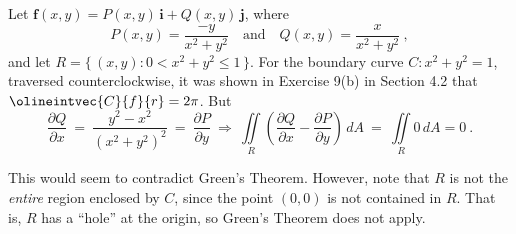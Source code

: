 \begin{exa}\label{exa:greenhole}
 Let $\textbf{f}(x,y) = P(x,y)\,\textbf{i} + Q(x,y)\,\textbf{j}$, where
 \begin{displaymath}
  P(x,y) = \frac{-y}{x^2 + y^2} \quad\text{and}\quad Q(x,y) = \frac{x}{x^2 + y^2} ~,
 \end{displaymath}
 and let $R =\lbrace\,(x,y): 0 < x^2 + y^2 \le 1\,\rbrace$. For the boundary curve $C:x^2 + y^2 = 1$, traversed
 counterclockwise, it was shown in Exercise 9(b) in Section 4.2 that $\olineintvec{C}{f}{r} = 2\pi$. But
 \begin{displaymath}
  \frac{\partial Q}{\partial x} ~=~ \frac{y^2 - x^2}{(x^2 + y^2 )^2} ~=~ \frac{\partial P}{\partial y} ~
  \Rightarrow ~
  \iint\limits_{R} \left( \frac{\partial Q}{\partial x} - \frac{\partial P}{\partial y} \right)\,dA ~=~
  \iint\limits_{R} 0 \,dA = 0~.
 \end{displaymath}
\end{exa}
This would seem to contradict Green's Theorem. However, note that $R$ is not the \emph{entire} region enclosed by $C$,
since the point $(0,0)$ is not contained in $R$. That is, $R$ has a ``hole'' at the origin, so Green's Theorem does not
apply.

